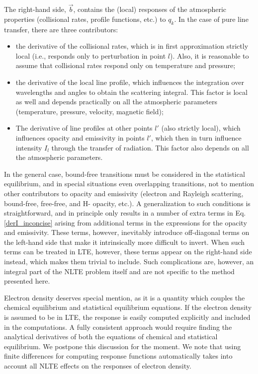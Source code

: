 \documentclass[referee]{aa}
\begin{document}
The right-hand side, $\vec{b}$, contains the (local) responses of the atmospheric properties (collisional rates, profile functions, etc.) to $q_k$. In the case of pure line transfer, there are three contributors:
\begin{itemize}
 \item the derivative of the collisional rates, which is in first approximation strictly local (i.e., responds only to perturbation in point $l$). Also, it is reasonable to assume that collisional rates respond only on temperature and pressure;
 \item the derivative of the local line profile, which influences the integration over wavelengths and angles to obtain the scattering integral. This factor is local as well and depends practically on all the atmospheric parameters (temperature, pressure, velocity, magnetic field);
 \item The derivative of line profiles at other points $l'$ (also strictly local), which influences opacity and emissivity in points $l'$, which then in turn influence intensity $I_l$ through the transfer of radiation. This factor also depends on all the atmospheric parameters.
\end{itemize}
In the general case, bound-free transitions must be considered in the statistical equilibrium, and in special situations even overlapping transitions, not to mention other contributors to opacity and emissivity (electron and Rayleigh scattering, bound-free, free-free, and H- opacity, etc.). A generalization to such conditions is straightforward, and in principle only results in a number of extra terms in Eq. \ref{derI_inconcise} arising from additional terms in the expressions for the opacity and emissivity. These terms, however, inevitably introduce off-diagonal terms on the left-hand side  that make it intrinsically more difficult to invert.  When such terms can be treated in LTE, however, these terms appear on the right-hand side instead, which makes them trivial to include. Such complications are, however, an integral part of the NLTE problem itself and are not specific to the method presented here.

Electron density deserves special mention, as it is a quantity which couples the chemical equilibrium and statistical equilibrium equations. If the electron density is assumed to be in LTE, the response is easily computed explicitly and included in the computations. A fully consistent approach would require finding the analytical derivatives of both the equations of chemical and statistical equilibrium. We postpone this discussion for the moment. We note that using finite differences for computing response functions automatically takes into account all NLTE effects on the responses of electron density.
\end{document}
